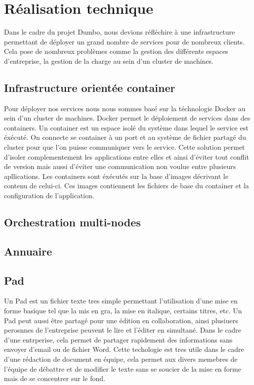 \section{Réalisation technique}

Dans le cadre du projet Dumbo, nous devions réfléchire à une infrastructure permettant de déployer un grand nombre de services pour de nombreux clients.
Cela pose de nombreux problèmes comme la gestion des différents espaces d'entreprise, la gestion de la charge au sein d'un cluster de machines.

\subsection{Infrastructure orientée container}

Pour déployer nos services nous nous sommes basé sur la téchnologie Docker au sein d'un cluster de machines.
Docker permet le déploiement de services dans des containers.
Un container est un espace isolé du système dans lequel le service est éxécuté.
On connecte se container à un port et au système de fichier partagé du cluster pour que l'on puisse communiquer vers le service.
Cette solution permet d'isoler complementement les applications entre elles et ainsi d'éviter tout conflit de version mais aussi d'éviter une communication non voulue entre plusieurs apllications.
Les containers sont éxécutés sur la base d'images décrivant le contenu de celui-ci.
Ces images contiennent les fichiers de base du container et la configuration de l'application.

\subsection{Orchestration multi-nodes}

\subsection{Annuaire}

\subsection{Pad}

Un Pad est un fichier texte tres simple permettant l'utilisation d'une mise en forme basique tel que la mis en gra, la mise en italique, certains titres, etc.
Un Pad peut aussi être partagé pour une édition en collaboration, ainsi plusiuers perosnnes de l'entreprise peuvent le lire et l'éditer en simultané.
Dans le cadre d'une entrperise, cela permet de partager rapidement des informations sans envoyer d'email ou de fichier Word.
Cette techologie est tres utile dans le cadre d'une rédaction de document en équipe, cela permet aux divers memebres de l'équipe de débattre et de modifier le texte sans se soucier de la mise en forme mais de se concentrer sur le fond.

